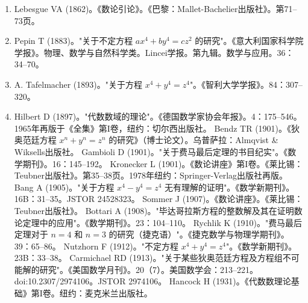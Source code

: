 \begin{enumerate}
\item Lebesgue VA (1862)。《数论引论》。《巴黎：Mallet-Bachelier出版社》。第71–73页。  
\item Pepin T (1883)。"关于不定方程 \( ax^4 + by^4 = cz^2 \) 的研究"。《意大利国家科学院学报》。物理、数学与自然科学类。Lincei学报。第九辑。数学与应用。36：34–70。  
\item A. Tafelmacher (1893)。"关于方程 \( x^4 + y^4 = z^4 \)"。《智利大学学报》。84：307–320。  
\item Hilbert D (1897)。"代数数域的理论"。《德国数学家协会年报》。4：175–546。1965年再版于《全集》第I卷，纽约：切尔西出版社。  
Bendz TR (1901)。《狄奥范廷方程 \( x^n + y^n = z^n \) 的研究》（博士论文）。乌普萨拉：Almqvist & Wiksells出版社。  
Gambioli D (1901)。"关于费马最后定理的书目纪实"。《数学期刊》。16：145–192。  
Kronecker L (1901)。《数论讲座》第I卷。《莱比锡：Teubner出版社》。第35–38页。1978年纽约：Springer-Verlag出版社再版。  
Bang A (1905)。"关于方程 \( x^4 - y^4 = z^4 \) 无有理解的证明"。《数学新期刊》。16B：31–35。JSTOR 24528323。  
Sommer J (1907)。《数论讲座》。《莱比锡：Teubner出版社》。  
Bottari A (1908)。"毕达哥拉斯方程的整数解及其在证明数论定理中的应用"。《数学期刊》。23：104–110。  
Rychlik K (1910)。"费马最后定理对于 \( n = 4 \) 和 \( n = 3 \) 的研究（捷克语）"。《捷克数学与物理学期刊》。39：65–86。  
Nutzhorn F (1912)。"不定方程 \( x^4 + y^4 = z^4 \)"。《数学新期刊》。23B：33–38。  
Carmichael RD (1913)。"关于某些狄奥范廷方程及方程组不可能解的研究"。《美国数学月刊》。20（7）。美国数学会：213–221。doi:10.2307/2974106。JSTOR 2974106。  
Hancock H (1931)。《代数数理论基础》第I卷。纽约：麦克米兰出版社。
\end{enumerate}